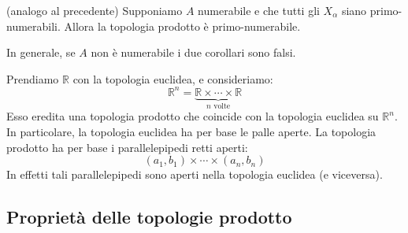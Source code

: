 \documentclass{article}
\begin{document}
\begin{cor}
	(analogo al precedente) Supponiamo $A$ numerabile e che tutti gli $X_\alpha$ siano primo-numerabili. Allora la topologia prodotto è 			primo-numerabile.
\end{cor}
\begin{oss}
	In generale, se $A$ non è numerabile i due corollari sono falsi.
\end{oss}
\begin{ex}
	Prendiamo $\mathbb{R}$ con la topologia euclidea, e consideriamo:
	$$\mathbb{R}^n=\underbrace{\mathbb{R} \times \cdots \times 	\mathbb{R}}_ {n\text{ volte}}$$
	Esso eredita una topologia prodotto che coincide con la topologia euclidea su $\mathbb{R}^n$. In particolare, la topologia euclidea ha 			per base le palle aperte. La topologia prodotto ha per base i parallelepipedi retti aperti:
	$$(a_1,b_1)\times \cdots \times (a_n,b_n)$$
	In effetti tali parallelepipedi sono aperti nella topologia euclidea (e viceversa).
\end{ex}

\subsection{Proprietà delle topologie prodotto}
\end{document}

